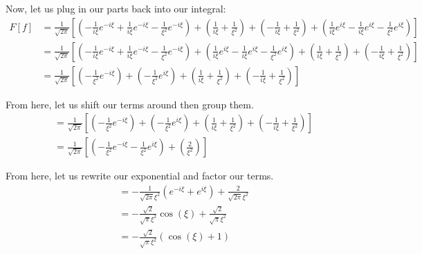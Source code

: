 \begin{enumerate}
Now, let us plug in our parts back into our integral:
%
\begin{align}
  F[f]
  & =
  \frac{1}{\sqrt{2 \pi}}
  \left[
    \left(
      - \frac{1}{ i \xi} e^{-i \xi}
      + \frac{1}{ i \xi} e^{-i \xi}
      - \frac{1}{ \xi^2} e^{-i \xi}
    \right)
    +
    \left(
      \frac{1}{ i \xi}
    + \frac{1}{ \xi^2}
    \right)
    +
    \left(
    - \frac{1}{ i \xi}
    + \frac{1}{ \xi^2}
    \right)
    +
    \left(
      \frac{1}{ i \xi} e^{i \xi}
    - \frac{1}{ i \xi} e^{i \xi}
    - \frac{1}{ \xi^2} e^{i \xi}
    \right)
  \right]\\
  & =
  \frac{1}{\sqrt{2 \pi}}
  \left[
  \left(
    - \frac{1}{ i \xi} e^{-i \xi}
    + \frac{1}{ i \xi} e^{-i \xi}
    - \frac{1}{ \xi^2} e^{-i \xi}
  \right)
  +
  \left(
  \frac{1}{ i \xi} e^{i \xi}
  - \frac{1}{ i \xi} e^{i \xi}
  - \frac{1}{ \xi^2} e^{i \xi}
  \right)
  +
  \left(
    \frac{1}{ i \xi}
  + \frac{1}{ \xi^2}
  \right)
  +
  \left(
  - \frac{1}{ i \xi}
  + \frac{1}{ \xi^2}
  \right)
  \right]\\
  & =
  \frac{1}{\sqrt{2 \pi}}
  \left[
  \left(
    - \frac{1}{ \xi^2} e^{-i \xi}
  \right)
  +
  \left(
    - \frac{1}{ \xi^2} e^{i \xi}
  \right)
  +
  \left(
    \frac{1}{ i \xi}
  + \frac{1}{ \xi^2}
  \right)
  +
  \left(
  - \frac{1}{ i \xi}
  + \frac{1}{ \xi^2}
  \right)
  \right]
\end{align}

From here, let us shift our terms around then group them.
%
\begin{align}
  & =
  \frac{1}{\sqrt{2 \pi}}
  \left[
  \left(
    - \frac{1}{ \xi^2} e^{-i \xi}
  \right)
  +
  \left(
    - \frac{1}{ \xi^2} e^{i \xi}
  \right)
  +
  \left(
    \frac{1}{ i \xi}
  + \frac{1}{ \xi^2}
  \right)
  +
  \left(
  - \frac{1}{ i \xi}
  + \frac{1}{ \xi^2}
  \right)
  \right]\\
  & =
  \frac{1}{\sqrt{2 \pi}}
  \left[
  \left(
    - \frac{1}{ \xi^2} e^{-i \xi}
    - \frac{1}{ \xi^2} e^{i \xi}
  \right)
  +
  \left(
   \frac{2}{ \xi^2}
  \right)
  \right]
\end{align}

From here, let us rewrite our exponential and factor our terms.
%
\begin{align}
  & =
  -\frac{1}{\sqrt{2 \pi} \xi^2}
  \left(
      e^{-i \xi}
    + e^{i \xi}
  \right)
  +
   \frac{2}{\sqrt{2 \pi} \xi^2}\\
   & =
   -\frac{\sqrt 2}{\sqrt{\pi} \xi^2} \cos(\xi)
   +
    \frac{\sqrt 2}{\sqrt{\pi} \xi^2}\\
  & =
  -\frac{\sqrt 2}{\sqrt \pi \xi^2} (\cos(\xi) + 1)
\end{align}
\end{enumerate}
